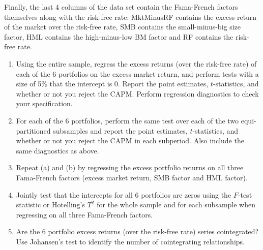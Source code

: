 \begin{enumerate}
Finally, the last 4 columns of the data set contain the Fama-French factors themselves along with the risk-free rate: MktMinusRF contains the excess return of the market over the risk-free rate, SMB contains the small-minus-big size factor, HML contains the high-minus-low BM factor and RF contains the risk-free rate.

	\begin{enumerate}
	\item Using the entire sample, regress the excess returns (over the risk-free rate) of each of the 6 portfolios on the excess market return, and perform tests with a size of 5\% that the intercept is 0. Report the point estimates, $t$-statistics, and whether or not you reject the CAPM. Perform regression diagnostics to check your specification.
	
	\item For each of the 6 portfolios, perform the same test over each of the two equi-partitioned subsamples and report the point estimates, $t$-statistics, and whether or not you reject the CAPM in each subperiod. Also include the same diagnostics as above.
	
	\item Repeat (a) and (b) by regressing the excess portfolio returns on all three Fama-French factors (excess market return, SMB factor and HML factor).
	
	\item Jointly test that the intercepts for all 6 portfolios are zeros using the $F$-test statistic or Hotelling's $T^2$ for the whole sample and for each subsample when regressing on all three Fama-French factors.
	
	\item Are the 6 portfolio excess returns (over the risk-free rate) series cointegrated? Use Johansen's test to identify the number of cointegrating relationships.
	\end{enumerate}



\end{enumerate}
